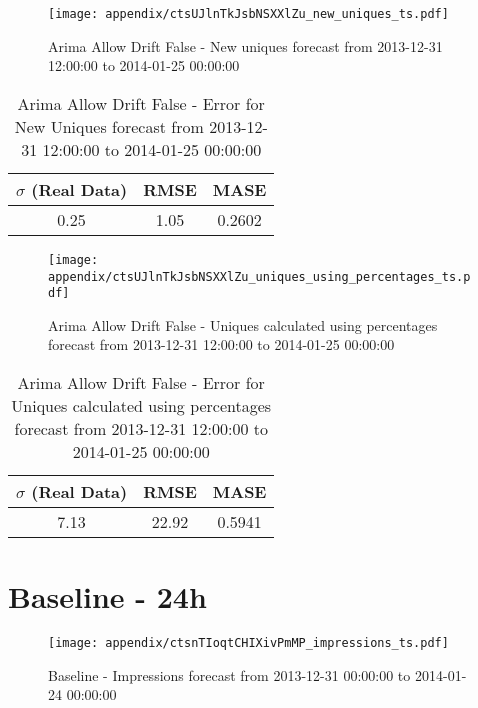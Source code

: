 \begin{figure}[H] \begin{center} \leavevmode
\texttt{[image: appendix/ctsUJlnTkJsbNSXXlZu\_new\_uniques\_ts.pdf]} \caption{
Arima Allow Drift False - New uniques forecast from 2013-12-31 12:00:00 to 2014-01-25 00:00:00} \label{fig:appendix/ctsUJlnTkJsbNSXXlZu_new_uniques_ts.pdf} \end{center}
\end{figure}

\begin{table}[H]
\centering
\footnotesize
\begin{tabular}{ccc}
$\sigma$ (Real Data) & RMSE & MASE   \\ \hline
0.25 & 1.05 & 0.2602 \\
\end{tabular}

\vspace{0.5cm}

\caption{
Arima Allow Drift False - Error for New Uniques forecast from 2013-12-31 12:00:00 to 2014-01-25 00:00:00}
\end{table}

\begin{figure}[H] \begin{center} \leavevmode
\texttt{[image: appendix/ctsUJlnTkJsbNSXXlZu\_uniques\_using\_percentages\_ts.pdf]} \caption{
Arima Allow Drift False - Uniques calculated using percentages forecast from 2013-12-31 12:00:00 to 2014-01-25 00:00:00} \label{fig:appendix/ctsUJlnTkJsbNSXXlZu_uniques_using_percentages_ts.pdf} \end{center}
\end{figure}

\begin{table}[H]
\centering
\footnotesize
\begin{tabular}{ccc}
$\sigma$ (Real Data) & RMSE & MASE   \\ \hline
7.13 & 22.92 & 0.5941 \\
\end{tabular}

\vspace{0.5cm}

\caption{
Arima Allow Drift False - Error for Uniques calculated using percentages forecast from 2013-12-31 12:00:00 to 2014-01-25 00:00:00}
\end{table}

\section{Baseline - 24h}
\begin{figure}[H] \begin{center} \leavevmode
\texttt{[image: appendix/ctsnTIoqtCHIXivPmMP\_impressions\_ts.pdf]} \caption{
Baseline - Impressions forecast from 2013-12-31 00:00:00 to 2014-01-24 00:00:00} \label{fig:appendix/ctsnTIoqtCHIXivPmMP_impressions_ts.pdf} \end{center}
\end{figure}

